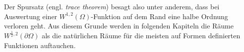 \documentclass[bibliography=totoc,12pt,a4paper]{scrartcl}
\theoremstyle{exampstyle}
\numberwithin{equation}{section}
\begin{document}
Der Spursatz (engl. \textit{trace theorem}) besagt also unter anderem, dass bei Auswertung einer $W^{1,2}(\Omega)$-Funktion auf dem Rand eine halbe Ordnung verloren geht. Aus diesem Grunde werden in folgenden Kapiteln die Räume $W^{\frac{1}{2},2}(\partial \Omega)$ als die natürlichen Räume für die meisten auf Formen definierten Funktionen auftauchen.

\newpage
\nocite{*}


\end{document}
